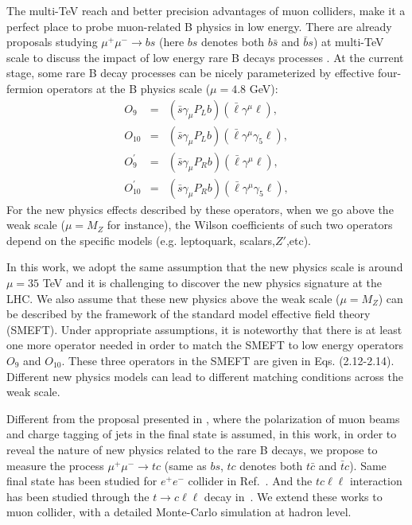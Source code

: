 \documentclass[a4paper,11pt]{article}
\begin{document}
The multi-TeV reach and better precision advantages of muon colliders, make it a perfect place to probe muon-related B physics in low energy. 
There are already proposals studying $\mu^+\mu^-\to bs$ (here $bs$ denotes both $b\bar{s}$ and $\bar{b}s$) at multi-TeV scale to discuss the impact of low energy rare B decays processes \cite{Altmannshofer:2022xri,Huang:2021nkl,Huang:2021biu}. 
At the current stage, some rare B decay processes can be nicely parameterized by effective four-fermion operators at the B physics scale ($\mu= 4.8$ GeV):
 \begin{eqnarray}
   O_9 &=& (\bar{s}\gamma_\mu P_L b)(\bar{\ell}\gamma^{\mu}\ell),  \\
   O_{10} &=& (\bar{s}\gamma_\mu P_L b)(\bar{\ell}\gamma^{\mu}\gamma_5\ell), \\
   O^{\prime}_9 &=& (\bar{s}\gamma_\mu P_R b)(\bar{\ell}\gamma^{\mu}\ell),\\
   O^{\prime}_{10} &=& (\bar{s}\gamma_\mu P_R b)(\bar{\ell}\gamma^{\mu}\gamma_5\ell),
\end{eqnarray}
For the new physics effects described by these operators, when we go above the weak scale ($\mu=M_Z$ for instance), 
the Wilson coefficients of such two operators depend on the specific models (e.g. leptoquark, scalars,$Z'$,etc). 

In this work, we adopt the same assumption that the new physics scale is around $\mu=35$ TeV and it is challenging to discover the new physics signature at the LHC. 
We also assume that these new physics above the weak scale ($\mu=M_Z$) can be described by the framework of the standard model effective field theory (SMEFT). 
Under appropriate assumptions, it is noteworthy that there is at least one more operator needed in order to match the SMEFT to low energy operators $O_9$ and $O_{10}$. 
These three operators in the SMEFT are given in Eqs. (2.12-2.14). 
Different new physics models can lead to different matching conditions across the weak scale.

Different from the proposal presented in \cite{Altmannshofer:2022xri}, 
where the polarization of muon beams and charge tagging of jets in the final state is assumed, 
in this work, in order to reveal the nature of new physics related to the rare B decays, 
we propose to measure the process $\mu^+\mu^-\to tc$ (same as $bs$,  $tc$ denotes both $t \bar{c}$ and $\bar{t} c$). 
Same final state has been studied for $e^+e^-$ collider in Ref.~\cite{Bar-Shalom:1997ezk,Bar-Shalom:1997htk,Bar-Shalom:1999dtk}.
And the $tc\ell\ell$ interaction has been studied through the $t\to c\ell\ell$ decay in~\cite{Bause:2020auq}. 
We extend these works to muon collider, with a detailed Monte-Carlo simulation at hadron level.
\end{document}
